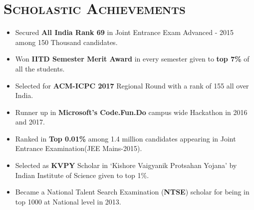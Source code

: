 \documentclass{article}
\newcommand{\tmpsection}[1]{}
\let\tmpsection=\section
\renewcommand{\section}[1]{\tmpsection*{\textsc{#1}}}
\begin{document}
\section{Scholastic Achievements}
\begin{itemize}
    \setlength\itemsep{0.0em}
    \item Secured \textbf{All India Rank 69} in Joint Entrance Exam Advanced - 2015 among 150 Thousand candidates.
    \item Won \textbf{IITD Semester Merit Award} in every semester given to \textbf{top 7\%} of all the students.
    \item Selected for \textbf{ACM-ICPC 2017} Regional Round with a rank of 155 all over India.
    \item Runner up in \textbf{Microsoft's Code.Fun.Do} campus wide Hackathon in 2016 and 2017.
    \item Ranked in \textbf{Top 0.01\%} among 1.4 million candidates appearing in Joint Entrance Examination(JEE Mains-2015).
    \item Selected as \textbf{KVPY} Scholar in `Kishore Vaigyanik Protsahan Yojana' by Indian Institute of Science given to top 1\%.
    \item Became a National Talent Search Examination (\textbf{NTSE}) scholar for being in top 1000 at National level in 2013.
\end{itemize}
\end{document}
